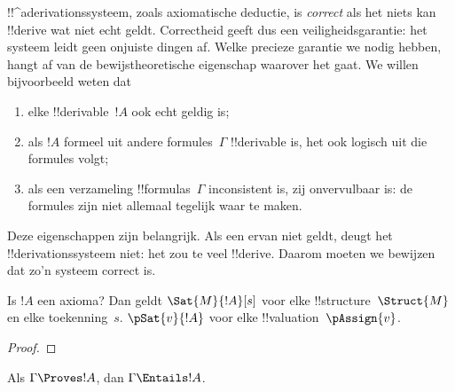 \documentclass[../../../include/open-logic-section]{subfiles}
\begin{document}
      {}
      {}
      

\begin{explain}
!!^a{derivation}ssysteem, zoals axiomatische deductie, is
\emph{correct} als het niets kan !!{derive} wat niet echt geldt.
Correctheid geeft dus een veiligheidsgarantie: het systeem leidt geen
onjuiste dingen af. Welke precieze garantie we nodig hebben, hangt af
van de bewijstheoretische eigenschap waarover het gaat. We willen
bijvoorbeeld weten dat
\begin{enumerate}
\item elke !!{derivable}~$!A$ ook echt geldig is;
\item als $!A$ formeel uit andere formules~$\Gamma$ !!{derivable} is,
  het ook logisch uit die formules volgt;
\item als een verzameling !!{formula}s~$\Gamma$ inconsistent is, zij
  onvervulbaar is: de formules zijn niet allemaal tegelijk waar te
  maken.
\end{enumerate}
Deze eigenschappen zijn belangrijk. Als een ervan niet geldt, deugt
het !!{derivation}ssysteem niet: het zou te veel !!{derive}. Daarom
moeten we bewijzen dat zo'n systeem correct is.
\end{explain}

\begin{prop}
  Is $!A$ een axioma? Dan geldt
    {$\Sat{M}{!A}[s]$ voor elke !!{structure}~$\Struct{M}$ en elke toekenning~$s$.}
    {$\pSat{v}{!A}$ voor elke !!{valuation}~$\pAssign{v}$.}
\end{prop}

\begin{proof}
\end{proof}

\begin{thm}
Als $\Gamma \Proves !A$, dan $\Gamma \Entails !A$.
\end{thm}
\end{document}
